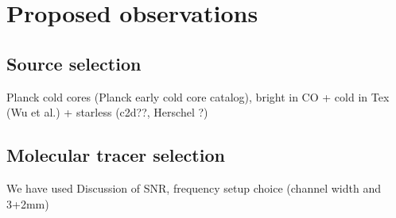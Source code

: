 \section{Proposed observations}
\subsection{Source selection}
  Planck cold cores (Planck early cold core catalog), bright in CO + cold in Tex (Wu et al.) + starless (c2d??, Herschel ?)
\subsection{Molecular tracer selection}
  We have used 
  Discussion of SNR, frequency setup choice (channel width and 3+2mm)
  
  
  